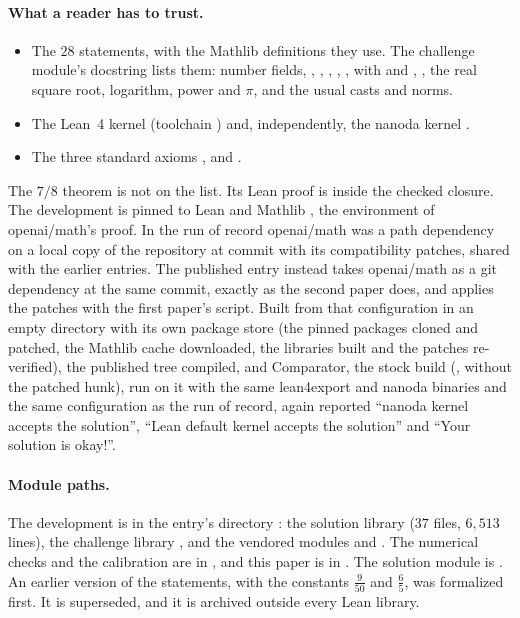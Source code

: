 \documentclass[11pt]{article}
\theoremstyle{definition}
\begin{document}
\paragraph{What a reader has to trust.}
\begin{itemize}[nosep]
\item The $28$ statements, with the Mathlib definitions they use. The challenge module's docstring lists them: number fields, , , , , ,  with  and , , the real square root, logarithm, power and $\pi$, and the usual casts and norms.
\item The Lean~4 kernel (toolchain ) and, independently, the nanoda kernel \cite{nanoda}.
\item The three standard axioms ,  and .
\end{itemize}
The $7/8$ theorem is not on the list. Its Lean proof is inside the checked closure. The development is pinned to Lean  and Mathlib  \cite{Mathlib2020,Lean4}, the environment of openai/math's proof. In the run of record openai/math was a path dependency on a local copy of the repository at commit  with its compatibility patches, shared with the earlier entries. The published entry instead takes openai/math as a git dependency at the same commit, exactly as the second paper does, and applies the patches with the first paper's script. Built from that configuration in an empty directory with its own package store (the pinned packages cloned and patched, the Mathlib cache downloaded, the libraries built and the patches re-verified), the published tree compiled, and Comparator, the stock  build (, without the patched hunk), run on it with the same lean4export and nanoda binaries and the same configuration as the run of record, again reported ``nanoda kernel accepts the solution'', ``Lean default kernel accepts the solution'' and ``Your solution is okay!''.

\paragraph{Module paths.} The development is in the entry's directory : the solution library  ($37$ files, $6{,}513$ lines), the challenge library , and the vendored modules  and . The numerical checks and the calibration are in , and this paper is in . The solution module is . An earlier version of the statements, with the constants $\frac9{50}$ and $\frac65$, was formalized first. It is superseded, and it is archived outside every Lean library.
\end{document}
